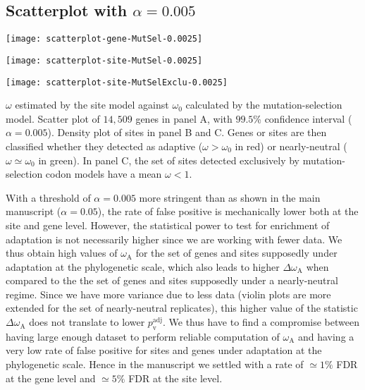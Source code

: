 \documentclass{article}
\renewcommand*{\bm}[1]{#1}%
\newcommand{\rateApop}{\omega_{\mathrm{A}}}
\begin{document}
    \subsection{Scatterplot with $\bm{\alpha=0.005}$}

    \begin{center}
        \begin{minipage}{0.32\linewidth}
            \texttt{[image: scatterplot-gene-MutSel-0.0025]}
        \end{minipage}
        \hfill
        \begin{minipage}{0.32\linewidth}
            \texttt{[image: scatterplot-site-MutSel-0.0025]}
        \end{minipage}
        \hfill
        \begin{minipage}{0.32\linewidth}
            \texttt{[image: scatterplot-site-MutSelExclu-0.0025]}
        \end{minipage}
        \hfill
    \end{center}

    $\omega$ estimated by the site model against $\omega_{0}$ calculated by the mutation-selection model.
    Scatter plot of $14,509$ genes in panel A, with $99.5$\% confidence interval ($\alpha=0.005$).
    Density plot of sites in panel B and C.
    Genes or sites are then classified whether they detected as adaptive ($\omega > \omega_{0}$ in red) or nearly-neutral ($\omega \simeq \omega_{0}$ in green).
    In panel C, the set of sites detected exclusively by mutation-selection codon models have a mean $\omega < 1 $.

    

    With a threshold of $\alpha=0.005$ more stringent than as shown in the main manuscript ($\alpha=0.05$), the rate of false positive is mechanically lower both at the site and gene level.
    However, the statistical power to test for enrichment of adaptation is not necessarily higher since we are working with fewer data.
    We thus obtain high values of $\rateApop$ for the set of genes and sites supposedly under adaptation at the phylogenetic scale, which also leads to higher $\Delta \rateApop$ when compared to the the set of genes and sites supposedly under a nearly-neutral regime.
    Since we have more variance due to less data (violin plots are more extended for the set of nearly-neutral replicates), this higher value of the statistic $\Delta \rateApop$
    does not translate to lower $p_{\mathrm{v}}^{\mathrm{adj}}$.
    We thus have to find a compromise between having large enough dataset to perform reliable computation of $\rateApop$ and having a very low rate of false positive for sites and genes under adaptation at the phylogenetic scale.
    Hence in the manuscript we settled with a rate of $\simeq 1 \%$ FDR at the gene level and $\simeq 5 \%$ FDR at the site level.
\end{document}
